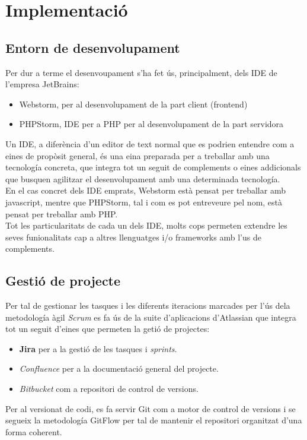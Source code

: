\section{Implementació}
\subsection{Entorn de desenvolupament}
Per dur a terme el desenvoupament s'ha fet ús, principalment, dels IDE\cite{ide} de l'empresa JetBrains\cite{jetbrains}:
\begin{itemize}
	\item Webstorm, per al desenvolupament de la part client (frontend)
	\item PHPStorm, IDE per a PHP per al desenvolupament de la part servidora
\end{itemize}
Un IDE, a diferència d'un editor de text normal que es podrien entendre com a eines de propòsit general, és una eina preparada per a treballar amb una tecnología concreta, que integra tot un seguit de complements o eines addicionals que busquen agilitzar el desenvolupament amb una determinada tecnología.\\
En el cas concret dels IDE emprats, Webstorm està pensat per treballar amb javascript, mentre que PHPStorm, tal i com es pot entreveure pel nom, està pensat per treballar amb PHP.\\
Tot les particularitats de cada un dels IDE, molts cops permeten extendre les seves funionalitats cap a altres llenguatges i/o frameworks amb l'us de complements.
\subsection{Gestió de projecte}
Per tal de gestionar les tasques i les diferents iteracions marcades per l'ús dela metodología àgil \textit{Scrum}\cite{scrum} es fa ús de la suite d'aplicacions d'Atlassian\cite{atlassian} que integra tot un seguit d'eines que permeten la getió de projectes:
\begin{itemize}
	\item \textbf{Jira} per a la gestió de les tasques i \textit{sprints}.
	\item \textit{Confluence} per a la documentació general del projecte.
	\item \textit{Bitbucket} com a repositori de control de versions.
\end{itemize}
Per al versionat de codi, es fa servir Git\cite{git} com a motor de control de versions i se segueix la metodología GitFlow\cite{gitflow} per tal de mantenir el repositori organitzat d'una forma coherent.